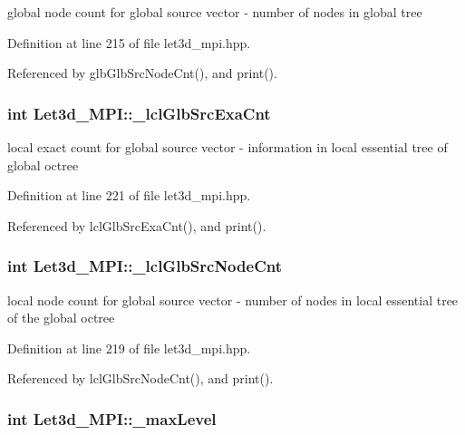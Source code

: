global node count for global source vector - number of nodes in global tree 

Definition at line 215 of file let3d\_\-mpi.hpp.

Referenced by glb\-Glb\-Src\-Node\-Cnt(), and print().
\subsubsection{\setlength{\rightskip}{0pt plus 5cm}int {\bf Let3d\_\-MPI::\_\-lcl\-Glb\-Src\-Exa\-Cnt}\hspace{0.3cm}{\tt  [protected]}}\label{classLet3d__MPI_7916bb5d6e176116bd3a9aa2e1c0ccf6_7916bb5d6e176116bd3a9aa2e1c0ccf6}


local exact count for global source vector - information in local essential tree of global octree 

Definition at line 221 of file let3d\_\-mpi.hpp.

Referenced by lcl\-Glb\-Src\-Exa\-Cnt(), and print().
\subsubsection{\setlength{\rightskip}{0pt plus 5cm}int {\bf Let3d\_\-MPI::\_\-lcl\-Glb\-Src\-Node\-Cnt}\hspace{0.3cm}{\tt  [protected]}}\label{classLet3d__MPI_1e51e1535d07bdac996a3968e6e2ad41_1e51e1535d07bdac996a3968e6e2ad41}


local node count for global source vector - number of nodes in local essential tree of the global octree 

Definition at line 219 of file let3d\_\-mpi.hpp.

Referenced by lcl\-Glb\-Src\-Node\-Cnt(), and print().
\subsubsection{\setlength{\rightskip}{0pt plus 5cm}int {\bf Let3d\_\-MPI::\_\-max\-Level}\hspace{0.3cm}{\tt  [protected]}}\label{classLet3d__MPI_3e92a4eebba860cc90434cef274b4081_3e92a4eebba860cc90434cef274b4081}


